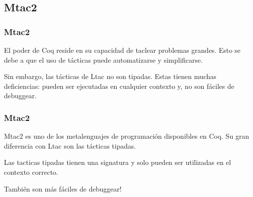 \documentclass{beamer}
\begin{document}
\begin{frame}
\section{Mtac2}
\frametitle{Mtac2}

El poder de Coq reside en su capacidad de taclear problemas grandes.
Esto se debe a que el uso de tácticas puede automatizarse y simplificarse.
\vspace{\baselineskip}

\pause
Sin embargo, las tácticas de Ltac no son tipadas.
Estas tienen muchas deficiencias: pueden ser ejecutadas en cualquier contexto y, no son fáciles de debuggear.
\end{frame}

\begin{frame}
\frametitle{Mtac2}

Mtac2 es uno de los metalenguajes de programación disponibles en Coq.
Su gran diferencia con Ltac son las tácticas tipadas.
\vspace{\baselineskip}

\pause
Las tacticas tipadas tienen una signatura y solo pueden ser utilizadas en el contexto correcto.
\vspace{\baselineskip}

\pause
También son más fáciles de debuggear!
\end{frame}

\end{document}
